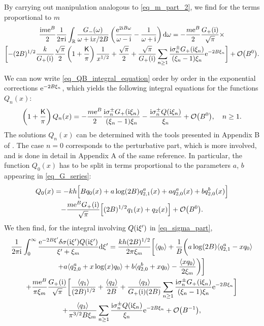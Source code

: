 \documentclass[a4paper,11pt]{article}
\theoremstyle{definition}
\newcommand{\re}{{\rm e}}
\newcommand{\ri}{{\rm i}}
\newcommand{\rd}{{\rm d}}
\begin{document}
By carrying out manipulation analogous to \eqref{eq_m_part_2}, we find for the terms proportional to $m$ 
\begin{multline}
\frac{\ri m\re^B}{2} \frac{1}{2\pi\ri} \int_\mathbb{R} \frac{G_-(\omega)}{\omega + \ri x/2B} \left( \frac{\re^{2\ri B\omega}}{\omega-\ri} - \frac{1}{\omega+\ri} \right) \rd \omega = -\frac{m\re^B}{2} \frac{G_+(\ri)}{\sqrt{\pi}}\times\\
\biggl[ -(2B)^{1/2}\frac{k}{G_+(\ri)}\frac{\sqrt{\pi}}{2}\left( 1 + \frac{\mathsf{K}}{\pi} \right)\frac{1}{x^{1/2}}
+ \frac{\sqrt{\pi}}{2} + \frac{\sqrt{\pi}}{G_+(\ri)}\sum_{n\ge 1} \frac{\ri\sigma^\pm_n G_+(\ri\xi_n)}{(\xi_n-1)\xi_n} \re^{-2B\xi_n} \biggr] + \mathcal{O}\big(B^0\big).
\end{multline}

We can now write \eqref{eq_QB_integral_equation} order by order in the exponential corrections $\re^{-2B\xi_n}$, which yields the following integral equations for the functions $Q_{n}(x)$:
\begin{equation}
\left( 1 + \frac{\mathsf{K}}{\pi} \right) Q_{n}(x) = -\frac{m\re^B}{2} \frac{\ri\sigma^\pm_n G_+(\ri\xi_n)}{(\xi_n-1)\xi_n} - \frac{\ri\sigma^\pm_n Q(\ri\xi_n)}{\xi_n} + \mathcal{O}\big(B^0\big), \quad n\ge 1.
\end{equation}
The solutions $Q_{n}(x)$ can be determined with the tools presented in Appendix B of \cite{mmr-an}. The case $n=0$ corresponds to the perturbative part, which is more involved, and is done in detail in Appendix A of the same reference. In particular, the function $Q_{0}(x)$ has to be split in terms proportional to the parameters $a$, $b$ appearing in \eqref{eq_G_series}:
\begin{multline}
Q_{0}(x) = -kh \Bigl[ B q_0(x) + a\log(2B)q_{2,1}^a(x) + a q_{2,0}^a(x) + b q_{2,0}^b(x) \Bigr]\\
 - \frac{m\re^B G_+(\ri)}{\sqrt{\pi}} \Bigl[ (2B)^{1/2} q_1(x) + q_2(x) \Bigr] + \mathcal{O}\bigl(B^0\bigr).
\end{multline}
We then find, for the integral involving $Q(\ri\xi')$ in \eqref{eq_sigma_part},
\begin{multline}
\frac{1}{2\pi\ri} \int_0^\infty \frac{\re^{-2B\xi'}\delta\sigma(\ri\xi')Q(\ri\xi')}{\xi' + \xi_m} \rd\xi' = \frac{kh(2B)^{1/2}}{2\pi\xi_m} \biggl[ \langle q_0 \rangle + \frac{1}{B}\biggl( a\log(2B) \langle q_{2,1}^a - xq_0\rangle\\
+ a\langle q_{2,0}^a+x\log(x)q_0 \rangle + b\langle q_{2,0}^b + xq_0 \rangle - \frac{\langle xq_0\rangle}{2\xi_m} \biggr) \biggr]\\
+ \frac{m\re^B}{\pi\xi_m} \frac{G_+(\ri)}{\sqrt{\pi}} \biggl[ \frac{\langle q_1 \rangle}{(2B)^{1/2}} + \frac{\langle q_2 \rangle}{2B} + \frac{\langle q_3 \rangle}{G_+(\ri)(2B)}\sum_{n\ge 1} \frac{\ri\sigma^\pm_n G_+(\ri\xi_n)}{(\xi_n-1)\xi_n}\re^{-2B\xi_n} \biggr]\\
+ \frac{\langle q_3 \rangle}{\pi^{3/2}B\xi_m}\sum_{n\ge 1} \frac{\ri\sigma^\pm_n Q(\ri\xi_n)}{\xi_n} \re^{-2B\xi_n} + \mathcal{O}\big(B^{-1}\big),
\label{eq_Q_integral_part}
\end{multline}
\end{document}
